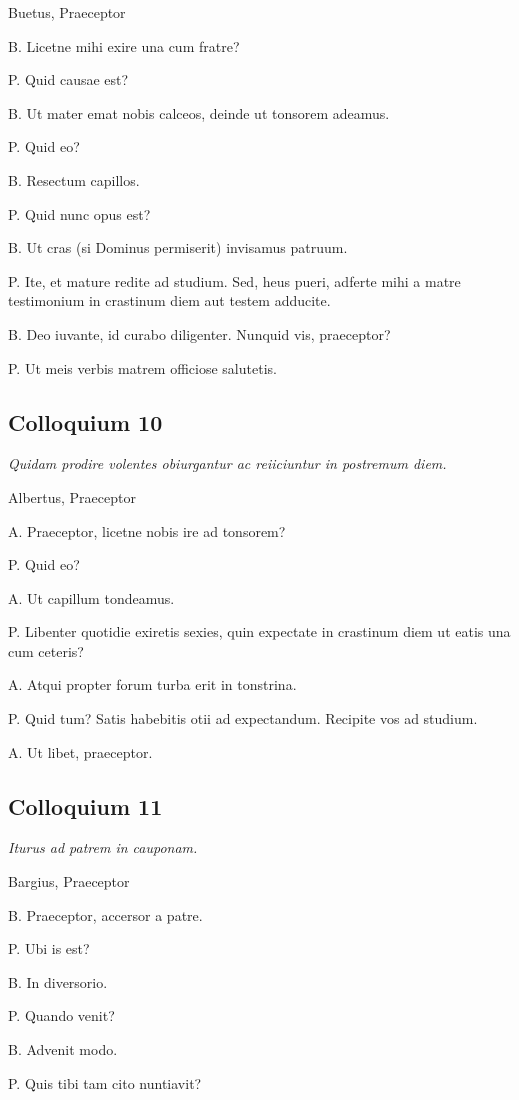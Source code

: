 \documentclass{article}
\begin{document}
Buetus, Praeceptor

B. Licetne mihi exire una cum fratre?

P. Quid causae est?

B. Ut mater emat nobis calceos, deinde ut tonsorem adeamus.

P. Quid eo?

B. Resectum capillos.

P. Quid nunc opus est?

B. Ut cras (si Dominus permiserit) invisamus patruum.

P. Ite, et mature redite ad studium. Sed, heus pueri, adferte mihi a matre testimonium in crastinum diem aut testem adducite.

B. Deo iuvante, id curabo diligenter. Nunquid vis, praeceptor?

P. Ut meis verbis matrem officiose salutetis.

\subsection{Colloquium 10}
\emph{Quidam prodire volentes obiurgantur ac reiiciuntur in postremum diem.}

Albertus, Praeceptor

A. Praeceptor, licetne nobis ire ad tonsorem?

P. Quid eo?

A. Ut capillum tondeamus.

P. Libenter quotidie exiretis sexies, quin expectate in crastinum diem ut eatis una cum ceteris?

A. Atqui propter forum turba erit in tonstrina.

P. Quid tum? Satis habebitis otii ad expectandum. Recipite vos ad studium.

A. Ut libet, praeceptor.

\subsection{Colloquium 11}
\emph{Iturus ad patrem in cauponam.}

Bargius, Praeceptor

B. Praeceptor, accersor a patre.

P. Ubi is est?

B. In diversorio.

P. Quando venit?

B. Advenit modo.

P. Quis tibi tam cito nuntiavit?
\end{document}
